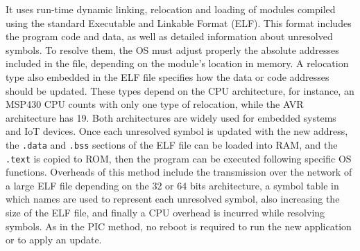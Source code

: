 \begin{itemize}
	It uses run-time dynamic linking, relocation and loading of modules compiled using the standard Executable and Linkable Format (ELF).
	This format includes the program code and data, as well as detailed information about unresolved symbols.
	To resolve them, the OS must adjust properly the absolute addresses included in the file, depending on the module's location in memory.
	A relocation type also embedded in the ELF file specifies how the data or code addresses should be updated.
	These types depend on the CPU architecture, for instance, an MSP430 CPU counts with only one type of relocation, while the AVR architecture has 19.
	Both architectures are widely used for embedded systems and IoT devices.
	Once each unresolved symbol is updated with the new address, the \texttt{.data} and \texttt{.bss} sections of the ELF file can be loaded into RAM, and the \texttt{.text} is copied to ROM, then the program can be executed following specific OS functions.
	Overheads of this method include the transmission over the network of a large ELF file depending on the 32 or 64 bits architecture, a symbol table in which names are used to represent each unresolved symbol, also increasing the size of the ELF file, and finally a CPU overhead is incurred while resolving symbols.
	As in the PIC method, no reboot is required to run the new application or to apply an update.
\end{itemize}

